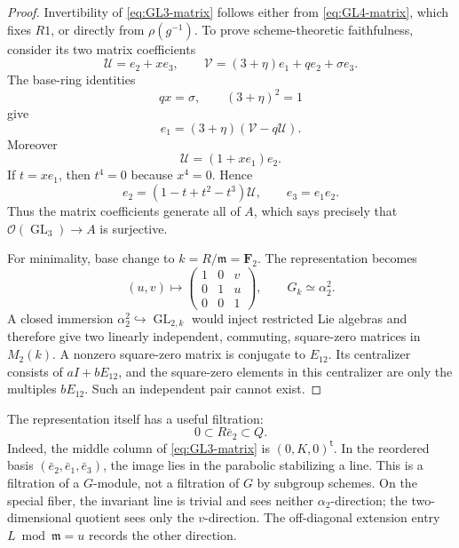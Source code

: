 \documentclass[11pt]{article}
\theoremstyle{remark}
\newcommand{\F}{\mathbf F}
\newcommand{\GL}{\operatorname{GL}}
\newcommand{\m}{\mathfrak m}
\begin{document}
\begin{proof}
Invertibility of \eqref{eq:GL3-matrix} follows either from
\eqref{eq:GL4-matrix}, which fixes \(R1\), or directly from
\(\rho(g^{-1})\).  To prove scheme-theoretic faithfulness, consider its two
matrix coefficients
\[
 \mathcal U=e_2+xe_3,\qquad
 \mathcal V=(3+\eta)e_1+qe_2+\sigma e_3.
\]
The base-ring identities
\[
 qx=\sigma,\qquad (3+\eta)^2=1
\]
give
\begin{equation}\label{eq:recover-e1}
 e_1=(3+\eta)(\mathcal V-q\mathcal U).
\end{equation}
Moreover
\[
 \mathcal U=(1+xe_1)e_2.
\]
If \(t=xe_1\), then \(t^4=0\) because \(x^4=0\).  Hence
\begin{equation}\label{eq:recover-e2}
 e_2=(1-t+t^2-t^3)\mathcal U,
 \qquad e_3=e_1e_2.
\end{equation}
Thus the matrix coefficients generate all of \(A\), which says precisely
that \(\mathcal O(\GL_3)\to A\) is surjective.

For minimality, base change to \(k=R/\m=\F_2\).  The representation becomes
\begin{equation}\label{eq:special-GL3}
 (u,v)\longmapsto
 \begin{pmatrix}1&0&v\\0&1&u\\0&0&1\end{pmatrix},
 \qquad G_k\simeq\alpha_2^2.
\end{equation}
A closed immersion \(\alpha_2^2\hookrightarrow\GL_{2,k}\) would inject
restricted Lie algebras and therefore give two linearly independent,
commuting, square-zero matrices in \(M_2(k)\).  A nonzero square-zero
matrix is conjugate to \(E_{12}\).  Its centralizer consists of
\(aI+bE_{12}\), and the square-zero elements in this centralizer are only
the multiples \(bE_{12}\).  Such an independent pair cannot exist.
\end{proof}

The representation itself has a useful filtration:
\begin{equation}\label{eq:module-filtration}
 0\subset R\bar e_2\subset Q.
\end{equation}
Indeed, the middle column of \eqref{eq:GL3-matrix} is
\((0,K,0)^{\mathsf t}\).  In the reordered basis
\((\bar e_2,\bar e_1,\bar e_3)\), the image lies in the parabolic stabilizing
a line.  This is a filtration of a \(G\)-module, not a filtration of \(G\)
by subgroup schemes.  On the special fiber, the invariant line is trivial
and sees neither \(\alpha_2\)-direction; the two-dimensional quotient sees
only the \(v\)-direction.  The off-diagonal extension entry
\(L\bmod\m=u\) records the other direction.
\end{document}
